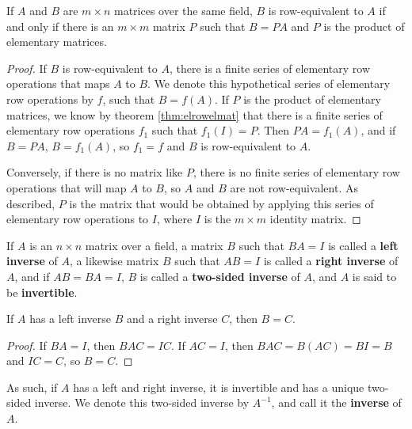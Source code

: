 \documentclass[12pt]{article}
\begin{document}
\begin{cor} \label{cor:rowequivelmatprod}
  If $A$ and $B$ are $m \times n$ matrices over the same field,
  $B$ is row-equivalent to $A$ if and only if there is an $m
  \times m$ matrix $P$ such that $B = PA$ and $P$ is the product
  of elementary matrices.

  \begin{proof}
    If $B$ is row-equivalent to $A$, there is a finite series of
    elementary row operations that maps $A$ to $B$. We denote
    this hypothetical series of elementary row operations by $f$,
    such that $B = f(A)$. If $P$ is the product of elementary
    matrices, we know by theorem \ref{thm:elrowelmat} that there
    is a finite series of elementary row operations $f_1$ such
    that $f_1(I) = P$. Then $PA = f_1(A)$, and if $B = PA$, $B =
    f_1(A)$, so $f_1 = f$ and $B$ is row-equivalent to $A$.

    Conversely, if there is no matrix like $P$, there is no
    finite series of elementary row operations that will map $A$
    to $B$, so $A$ and $B$ are not row-equivalent. As described,
    $P$ is the matrix that would be obtained by applying this
    series of elementary row operations to $I$, where $I$ is the
    $m \times m$ identity matrix.
  \end{proof}
\end{cor}

\begin{defn}
  If $A$ is an $n \times n$ matrix over a field, a matrix $B$
  such that $BA = I$ is called a \textbf{left inverse} of $A$, a
  likewise matrix $B$ such that $AB = I$ is called a
  \textbf{right inverse} of $A$, and if $AB = BA = I$, $B$ is
  called a \textbf{two-sided inverse} of $A$, and $A$ is said to
  be \textbf{invertible}.

  \begin{nlemma}
    If $A$ has a left inverse $B$ and a right inverse $C$, then
    $B = C$.
    \begin{proof}
      If $BA = I$, then $BAC = IC$. If $AC = I$, then $BAC =
      B(AC) = BI = B$ and $IC = C$, so $B = C$.
    \end{proof}
  \end{nlemma}

  As such, if $A$ has a left and right inverse, it is invertible
  and has a unique two-sided inverse. We denote this two-sided
  inverse by $A^{-1}$, and call it the \textbf{inverse} of $A$.
\end{defn}
\end{document}
